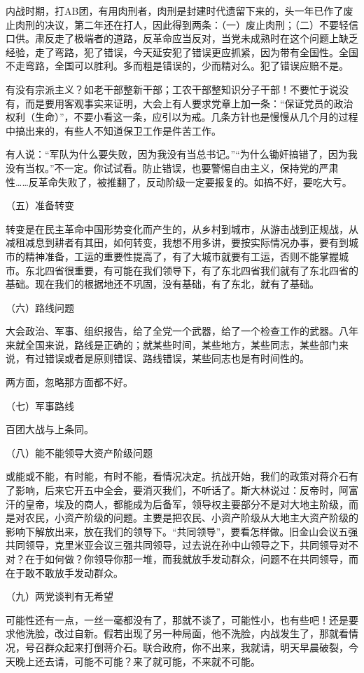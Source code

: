 内战时期，打AB团，有用肉刑者，肉刑是封建时代遗留下来的，头一年已作了废止肉刑的决议，第二年还在打人，因此得到两条：（一）废止肉刑；（二）不要轻信口供。肃反走了极端者的道路，反革命应当反对，当党未成熟时在这个问题上缺乏经验，走了弯路，犯了错误，今天延安犯了错误更应抓紧，因为带有全国性。全国不走弯路，全国可以胜利。多而粗是错误的，少而精对么。犯了错误应赔不是。

有没有宗派主义？如老干部整新干部；工农干部整知识分子干部！不要忙于说没有，而是要用客观事实来证明，大会上有人要求党章上加一条：“保证党员的政治权利（生命）”，不要小看这一条，应引以为戒。几条方针也是慢慢从几个月的过程中搞出来的，有些人不知道保卫工作是件苦工作。

有人说：“军队为什么要失败，因为我没有当总书记。”“为什么锄奸搞错了，因为我没有当权。”不一定。你试试看。防止错误，也要警惕自由主义，保持党的严肃性……反革命失败了，被推翻了，反动阶级一定要报复的。如搞不好，要吃大亏。

（五）准备转变

转变是在民主革命中国形势变化而产生的，从乡村到城市，从游击战到正规战，从减租减息到耕者有其田，如何转变，我想不用多讲，要按实际情况办事，要有到城市的精神准备，工运的重要性提高了，有了大城市就要有工运，否则不能掌握城市。东北四省很重要，有可能在我们领导下，有了东北四省我们就有了东北四省的基础。现在我们的根据地还不巩固，没有基础，有了东北，就有了基础。

（六）路线问题

大会政治、军事、组织报告，给了全党一个武器，给了一个检查工作的武器。八年来就全国来说，路线是正确的；就某些时间，某些地方，某些同志，某些部门来说，有过错误或者是原则错误、路线错误，某些同志也是有时间性的。

两方面，忽略那方面都不好。

（七）军事路线

百团大战与上条同。

（八）能不能领导大资产阶级问题

或能或不能，有时能，有时不能，看情况决定。抗战开始，我们的政策对蒋介石有了影响，后来它开五中全会，要消灭我们，不听话了。斯大林说过：反帝时，阿富汗的皇帝，埃及的商人，都能成为后备军，领导权主要部分不是对大地主阶级，而是对农民，小资产阶级的问题。主要是把农民、小资产阶级从大地主大资产阶级的影响下解放出来，放在我们的领导下。“共同领导”，要看怎样做。旧金山会议五强共同领导，克里米亚会议三强共同领导，过去说在孙中山领导之下，共同领导对不对？在于如何做？你领导你那一堆，而我就放手发动群众，问题不在共同领导，而在于敢不敢放手发动群众。

（九）两党谈判有无希望

可能性还有一点，一丝一毫都没有了，那就不谈了，可能性小，也有些吧！还是要求他洗脸，改过自新。假若出现了另一种局面，他不洗脸，内战发生了，那就看情况，号召群众起来打倒蒋介石。联合政府，你不出来，我就请，明天早晨破裂，今天晚上还去请，可能不可能？来了就可能，不来就不可能。



